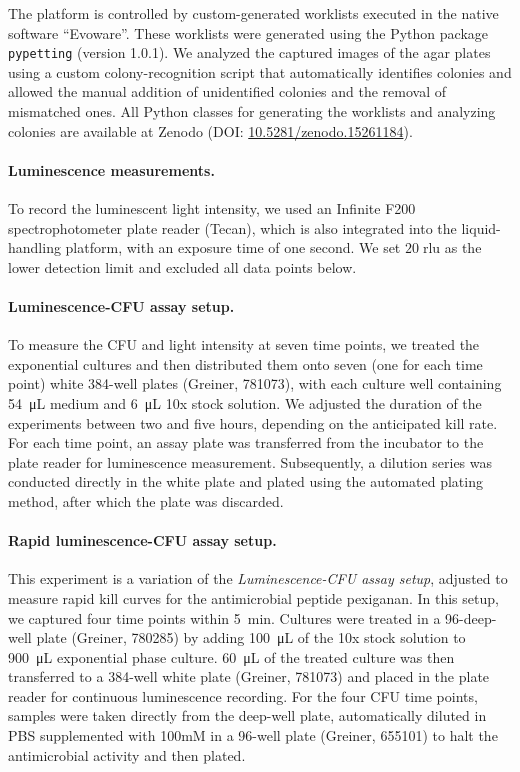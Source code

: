 The platform is controlled by custom-generated worklists executed in the native software ``Evoware''.
These worklists were generated using the Python package \texttt{pypetting} (version 1.0.1).
We analyzed the captured images of the agar plates using a custom colony-recognition script that automatically identifies colonies and allowed the manual addition of unidentified colonies and the removal of mismatched ones.
All Python classes for generating the worklists and analyzing colonies are available at Zenodo (DOI: \href{https://doi.org/10.5281/zenodo.15261184}{10.5281/zenodo.15261184}).

\paragraph{Luminescence measurements.}
To record the luminescent light intensity, we used an Infinite F200 spectrophotometer plate reader (Tecan), which is also integrated into the liquid-handling platform, with an exposure time of one second.
We set \(20\;\mathrm{rlu}\) as the lower detection limit and excluded all data points below.

\paragraph{Luminescence-CFU assay setup.}
To measure the CFU and light intensity at seven time points, we treated the exponential cultures and then distributed them onto seven (one for each time point) white 384-well plates (Greiner, 781073), with each culture well containing \SI{54}{\micro\liter} medium and \SI{6}{\micro\liter} 10x stock solution.
We adjusted the duration of the experiments between two and five hours, depending on the anticipated kill rate.
For each time point, an assay plate was transferred from the incubator to the plate reader for luminescence measurement.
Subsequently, a dilution series was conducted directly in the white plate and plated using the automated plating method, after which the plate was discarded.

\paragraph{Rapid luminescence-CFU assay setup.}
This experiment is a variation of the \textit{Luminescence-CFU assay setup}, adjusted to measure rapid kill curves for the antimicrobial peptide pexiganan.
In this setup, we captured four time points within \SI{5}{\minute}.
Cultures were treated in a 96-deep-well plate (Greiner, 780285) by adding \SI{100}{\micro\liter} of the 10x stock solution to \SI{900}{\micro\liter} exponential phase culture.
\SI{60}{\micro\liter} of the treated culture was then transferred to a 384-well white plate (Greiner, 781073) and placed in the plate reader for continuous luminescence recording.
For the four CFU time points, samples were taken directly from the deep-well plate, automatically diluted in PBS supplemented with 100mM  in a 96-well plate (Greiner, 655101) to halt the antimicrobial activity and then plated.


